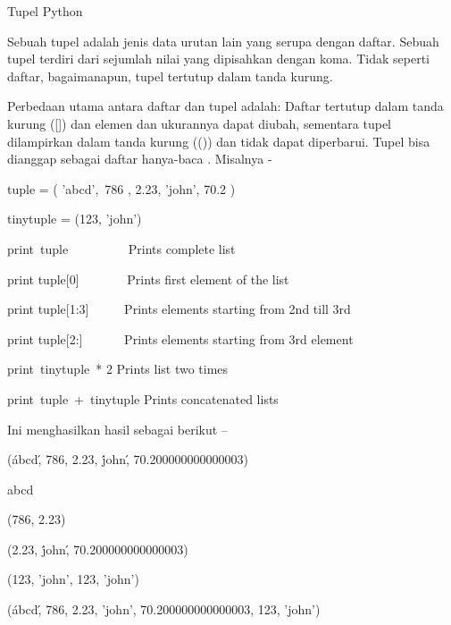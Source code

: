 \vspace{12pt}
\noindent 
Tupel Python \par
\vspace{12pt}
\noindent 
Sebuah tupel adalah jenis data urutan lain yang serupa dengan daftar. $  $Sebuah tupel terdiri dari sejumlah nilai yang dipisahkan dengan koma. $  $Tidak seperti daftar, bagaimanapun, tupel tertutup dalam tanda kurung. \par
\vspace{12pt}
\noindent 
Perbedaan utama antara daftar dan tupel adalah: Daftar tertutup dalam tanda kurung ([]) dan elemen dan ukurannya dapat diubah, sementara tupel dilampirkan dalam tanda kurung (()) dan tidak dapat diperbarui. $  $Tupel bisa dianggap sebagai $  $daftar $  $hanya-baca $  $. $  $Misalnya - \par
\vspace{12pt}
\vspace{12pt}
\noindent 
tuple = ( 'abcd',~786 , 2.23, 'john', 70.2  ) \par
\noindent 
tinytuple = (123, 'john') \par
\vspace{12pt}
\noindent 
print~tuple~~~~~~~~~   Prints complete list \par
\noindent 
print tuple[0]~~~~~~~  Prints first element of the list \par
\noindent 
print tuple[1:3]~~~~~  Prints elements starting from 2nd till 3rd  \par
\noindent 
print tuple[2:]~~~~~~  Prints elements starting from 3rd element \par
\noindent 
print~tinytuple~* 2    Prints list two times \par
\noindent 
print~tuple~+~tinytuple     Prints concatenated lists \par
\vspace{12pt}
\noindent 
Ini menghasilkan hasil sebagai berikut – \par
\vspace{12pt}
\noindent 
(\'abcd\', 786, 2.23, \'john\', 70.200000000000003) \par
\noindent 
abcd \par
\noindent 
(786, 2.23) \par
\noindent 
(2.23, \'john\', 70.200000000000003) \par
\noindent 
(123, 'john', 123, 'john') \par
\noindent 
(\'abcd\', 786, 2.23, 'john', 70.200000000000003, 123, 'john') \par
\vspace{12pt}
